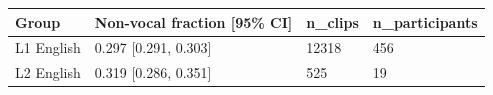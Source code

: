 \begin{tabular}{llll}
\toprule
Group & Non-vocal fraction [95\% CI] & n\_clips & n\_participants \\
\midrule
L1 English & 0.297 [0.291, 0.303] & 12318 & 456 \\
L2 English & 0.319 [0.286, 0.351] & 525 & 19 \\
\bottomrule
\end{tabular}

